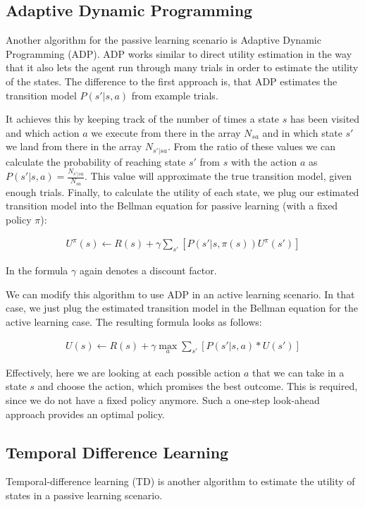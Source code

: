 \documentclass{llncs}
\begin{document}
\subsection{Adaptive Dynamic Programming}
Another algorithm for the passive learning scenario is Adaptive Dynamic Programming (ADP). ADP works similar to direct utility estimation in the way that it also lets the agent run through many trials in order to estimate the utility of the states. The difference to the first approach is, that ADP estimates the transition model $P(s'|s,a)$ from example trials.\par

It achieves this by keeping track of the number of times a state $s$ has been visited and which action $a$ we execute from there in the array $N_{sa}$ and in which state $s'$ we land from there in the array $N_{s'|sa}$. From the ratio of these values we can calculate the probability of reaching state $s'$ from $s$ with the action $a$ as $P(s'|s,a) = \frac{N_{s'|sa}}{N_{sa}}$. This value will approximate the true transition model, given enough trials. Finally, to calculate the utility of each state, we plug our estimated transition model into the Bellman equation for passive learning (with a fixed policy $\pi$):

\begin{align*}
U^{\pi}(s) \leftarrow R(s)+\gamma\sum_{s'}[P(s'|s,\pi(s))U^{\pi}(s')]
\end{align*}

In the formula $\gamma$ again denotes a discount factor.\par

We can modify this algorithm to use ADP in an active learning scenario. In that case, we just plug the estimated transition model in the Bellman equation for the active learning case. The resulting formula looks as follows:

\begin{align*}
U(s) \leftarrow R(s)+\gamma\max_{a}\sum_{s'}[P(s'|s,a)*U(s')]
\end{align*}

Effectively, here we are looking at each possible action $a$ that we can take in a state $s$ and choose the action, which promises the best outcome. This is required, since we do not have a fixed policy anymore. Such a one-step look-ahead approach provides an optimal policy.

\subsection{Temporal Difference Learning}
Temporal-difference learning (TD) is another algorithm to estimate the utility of states in a passive learning scenario.\par
\end{document}
